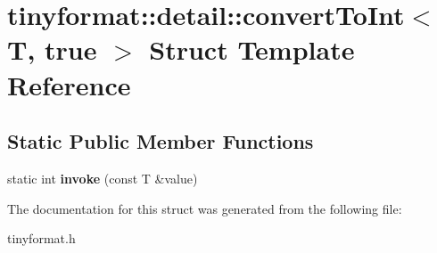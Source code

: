 \hypertarget{structtinyformat_1_1detail_1_1convertToInt_3_01T_00_01true_01_4}{}\section{tinyformat\+:\+:detail\+:\+:convert\+To\+Int$<$ T, true $>$ Struct Template Reference}
\label{structtinyformat_1_1detail_1_1convertToInt_3_01T_00_01true_01_4}
\subsection*{Static Public Member Functions}
\begin{DoxyCompactItemize}
\item 
\mbox{\label{structtinyformat_1_1detail_1_1convertToInt_3_01T_00_01true_01_4_a7d03793b995eb4428bb13349004f5fcd}} 
static int {\bfseries invoke} (const T \&value)
\end{DoxyCompactItemize}


The documentation for this struct was generated from the following file\+:\begin{DoxyCompactItemize}
\item 
tinyformat.\+h\end{DoxyCompactItemize}
